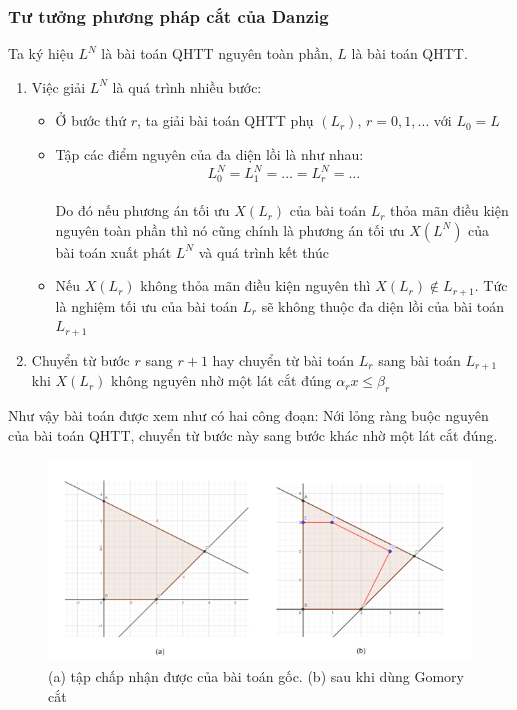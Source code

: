 \documentclass[12pt,a4paper]{article}\author{Nguyễn Nho Dũng}
\newcommand{\ngoacto}[1]{\left(#1\right)}
\begin{document}
\subsubsection{Tư tưởng phương pháp cắt của Danzig}
Ta ký hiệu $L^N$ là bài toán QHTT nguyên toàn phần, $L$ là bài toán QHTT.
\begin{enumerate}
	\item Việc giải $L^N$ là quá trình nhiều bước:
		\begin{itemize}
			\item Ở bước thứ $r$, ta giải bài toán QHTT phụ $\ngoacto{L_r},\, r=0,1,\ldots$ với $L_0 = L$
			\item Tập các điểm nguyên của đa diện lồi là như nhau: $$L^N_0 = L^N_1 = \ldots = L^N_r = \ldots$$\\
			Do đó nếu phương án tối ưu $X(L_r)$ của bài toán $L_r$ thỏa mãn điều kiện nguyên toàn phần thì nó cũng chính là phương án tối ưu $X(L^N)$ của bài toán xuất phát $L^N$ và quá trình kết thúc
			\item Nếu $X(L_r)$ không thỏa mãn điều kiện nguyên thì $X(L_r)\notin L_{r+1}$. Tức là nghiệm tối ưu của bài toán $L_r$ sẽ không thuộc đa diện lồi của bài toán $L_{r+1}$
		\end{itemize}
	\item Chuyển từ bước $r$ sang $r+1$ hay chuyển từ bài toán $L_r$ sang bài toán $L_{r+1}$ khi $X(L_r)$ không nguyên nhờ một lát cắt đúng $\alpha_r x\le \beta_r$
\end{enumerate}
\begin{nx}
	Như vậy bài toán được xem như có hai công đoạn: Nới lỏng ràng buộc nguyên của bài toán QHTT, chuyển từ bước này sang bước khác nhờ một lát cắt đúng.
\end{nx}
\begin{figure} [H]
    \centering
    \includegraphics{Anh/mota_gomory}
    \caption{(a) tập chấp nhận được của bài toán gốc. (b) sau khi dùng Gomory cắt}
    \label{fig:2}
\end{figure}
\end{document}
